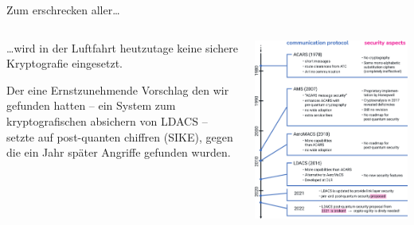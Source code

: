 \begin{frame}[c]{Zum erschrecken aller…}
  \begin{columns}[fullwidth,c]
    \begin{column}{.5\linewidth}
      \begin{itemize}

        \footnotesize
        …wird in der Luftfahrt heutzutage keine sichere Kryptografie eingesetzt. 

        \vspace{1em}
        Der eine Ernstzunehmende Vorschlag den wir gefunden hatten -- ein System zum kryptografischen absichern von LDACS --
        setzte auf post-quanten chiffren (SIKE), gegen die ein Jahr später Angriffe gefunden wurden.

      \end{itemize}
    \end{column}%
    \begin{column}{.5\linewidth}
      \includegraphics[width=.92\linewidth]{graphics/history of cryptography in avionics}
    \end{column}
  \end{columns}
\end{frame}


